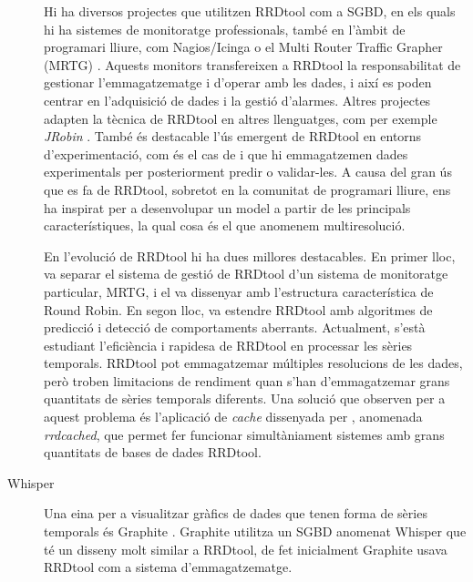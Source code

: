 \begin{description}
  Hi ha diversos projectes que utilitzen RRDtool com a \gls{SGBD}, en
  els quals hi ha sistemes de monitoratge professionals, també en
  l'àmbit de programari lliure, com
  Nagios/Icinga \parencite{nagios,icinga} o el Multi Router Traffic
  Grapher (MRTG) \parencite{mrtg}. Aquests monitors transfereixen a
  RRDtool la responsabilitat de gestionar l'emmagatzematge i d'operar
  amb les dades, i així es poden centrar en l'adquisició de dades i la
  gestió d'alarmes. Altres projectes adapten la tècnica de RRDtool en
  altres llenguatges, com per exemple
  \emph{JRobin} \parencite{jrobin}. També és destacable l'ús emergent
  de RRDtool en entorns d'experimentació, com és el cas de
  \textcite{zhang07} i \textcite{chilingaryan10} que hi emmagatzemen
  dades experimentals per posteriorment predir o validar-les.  A causa
  del gran ús que es fa de RRDtool, sobretot en la comunitat de
  programari lliure, ens ha inspirat per a desenvolupar un model a
  partir de les principals característiques, la qual cosa és el que
  anomenem multiresolució.


  En l'evolució de RRDtool hi ha dues millores destacables. En primer
  lloc, \textcite{lisa98:oetiker} va separar el sistema de gestió de
  RRDtool d'un sistema de monitoratge particular, MRTG, i el va
  dissenyar amb l'estructura característica de Round Robin. En segon
  lloc, \textcite{lisa00:brutlag} va estendre RRDtool amb algoritmes
  de predicció i detecció de comportaments aberrants.  Actualment,
  s'està estudiant l'eficiència i rapidesa de RRDtool en processar les
  sèries temporals.  RRDtool pot emmagatzemar múltiples resolucions de
  les dades, però \textcite{lisa07:plonka} troben limitacions de
  rendiment quan s'han d'emmagatzemar grans quantitats de sèries
  temporals diferents. Una solució que observen per a aquest problema
  és l'aplicació de \emph{cache} dissenyada per
  \textcite{carder:rrdcached}, anomenada \emph{rrdcached}, que permet
  fer funcionar simultàniament sistemes amb grans quantitats de bases
  de dades RRDtool.




\item[Whisper] Una eina per a visualitzar gràfics de dades que tenen
  forma de sèries temporals és Graphite \parencite{graphite}. Graphite
  utilitza un \gls{SGBD} anomenat Whisper que té un disseny molt
  similar a RRDtool, de fet inicialment Graphite usava RRDtool com a
  sistema d'emmagatzematge.






\end{description}
